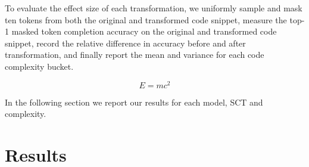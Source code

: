 \documentclass[sigconf,review,anonymous]{acmart}
\begin{document}
 To evaluate the effect size of each transformation, we uniformly sample and mask ten tokens from both the original and transformed code snippet, measure the top-1 masked token completion accuracy on the original and transformed code snippet, record the relative difference in accuracy before and after transformation, and finally report the mean and variance for each code complexity bucket.

  \begin{equation}
    E=mc^2
  \end{equation}

  In the following section we report our results for each model, SCT and complexity.

  \pagebreak\section{Results}\label{sec:results}
\end{document}
